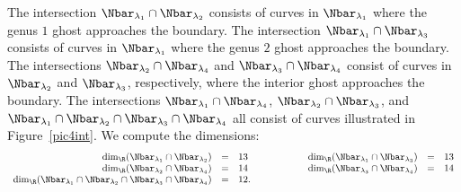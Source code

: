\begin{example}
The intersection $\Nbar_{\lambda_1} \cap \Nbar_{\lambda_2}$ consists of curves in $\Nbar_{\lambda_1}$ where the genus $1$ ghost approaches the boundary. The intersection $\Nbar_{\lambda_1} \cap \Nbar_{\lambda_3}$ consists of curves in $\Nbar_{\lambda_1}$ where the genus $2$ ghost approaches the boundary. The intersections $\Nbar_{\lambda_2} \cap \Nbar_{\lambda_4}$ and $\Nbar_{\lambda_3} \cap \Nbar_{\lambda_4}$ consist of curves in $\Nbar_{\lambda_2}$ and $\Nbar_{\lambda_3}$, respectively, where the interior ghost approaches the boundary. The intersections $\Nbar_{\lambda_1} \cap \Nbar_{\lambda_4}$, $\Nbar_{\lambda_2} \cap \Nbar_{\lambda_3}$, and $\Nbar_{\lambda_1} \cap \Nbar_{\lambda_2} \cap \Nbar_{\lambda_3} \cap \Nbar_{\lambda_4}$ all consist of curves illustrated in Figure~\ref{pic4int}. We compute the dimensions:
\[
\begin{array}{rclcrcl}
\dim_\R(\Nbar_{\lambda_1} \cap \Nbar_{\lambda_2}) & = & 13 & \qquad\qquad & \dim_\R(\Nbar_{\lambda_1} \cap \Nbar_{\lambda_3}) & = & 13
\\
\dim_\R(\Nbar_{\lambda_2} \cap \Nbar_{\lambda_4}) & = & 14 && \dim_\R(\Nbar_{\lambda_3} \cap \Nbar_{\lambda_4}) & = & 14
\\
\dim_\R(\Nbar_{\lambda_1} \cap \Nbar_{\lambda_2} \cap \Nbar_{\lambda_3} \cap \Nbar_{\lambda_4}) & = & 12.
\end{array}
\]

\begin{figure}[ht]
\centering
{}
\end{figure}
\end{example}
